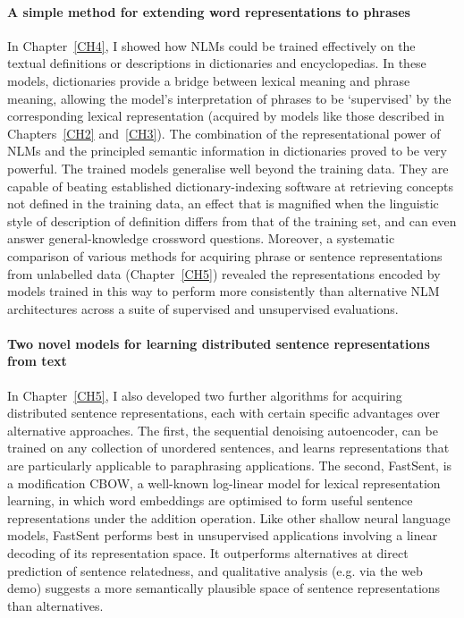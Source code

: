 \paragraph{A simple method for extending word representations to phrases} In Chapter~\ref{CH4}, I showed how NLMs could be trained effectively on the textual definitions or descriptions in dictionaries and encyclopedias. In these models, dictionaries provide a bridge between lexical meaning and phrase meaning, allowing the model's interpretation of phrases to be `supervised' by the corresponding lexical representation (acquired by models like those described in Chapters~\ref{CH2} and~\ref{CH3}). The combination of the representational power of NLMs and the principled semantic information in dictionaries proved to be very powerful. The trained models generalise well beyond the training data. They are capable of beating established dictionary-indexing software at retrieving concepts not defined in the training data, an effect that is magnified when the linguistic style of description of definition differs from that of the training set, and can even answer general-knowledge crossword questions. Moreover, a systematic comparison of various methods for acquiring phrase or sentence representations from unlabelled data (Chapter~\ref{CH5}) revealed the representations encoded by models trained in this way to perform more consistently than alternative NLM architectures across a suite of supervised and unsupervised evaluations. 

\paragraph{Two novel models for learning distributed sentence representations from text} In Chapter~\ref{CH5}, I also developed two further algorithms for acquiring distributed sentence representations, each with certain specific advantages over alternative approaches. The first, the sequential denoising autoencoder, can be trained on any collection of unordered sentences, and learns representations that are particularly applicable to paraphrasing applications. The second, FastSent, is a modification CBOW, a well-known log-linear model for lexical representation learning, in which word embeddings are optimised to form useful sentence representations under the addition operation. Like other shallow neural language models, FastSent performs best in unsupervised applications involving a linear decoding of its representation space. It outperforms alternatives at direct prediction of sentence relatedness, and qualitative analysis (e.g. via the web demo) suggests a more semantically plausible space of sentence representations than alternatives.       

